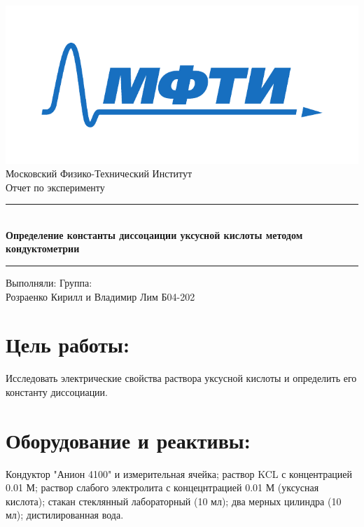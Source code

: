 \documentclass[a4paper,12pt]{article}
\begin{document}
\begin{titlepage}
		\vspace*{\fill}
		
		\begin{center}
			\includegraphics[scale=0.8]{MIPT.pdf}
			\\[0.7cm]\Huge Московский Физико-Технический Институт
			\\[2cm]\LARGE Отчет по эксперименту
			\\[0.5cm]\noindent\rule{\textwidth}{1pt}
			\\\Huge\textbf{Определение константы диссоцаиции уксусной кислоты методом кондуктометрии}
			\\[-0.5cm]\noindent\rule{\textwidth}{1pt}
		\end{center}
		
		\vspace*{\fill}
		
		\begin{flushleft}
			Выполняли: \hspace{\fill} Группа:
			\\Розраенко Кирилл и Владимир Лим \hspace{\fill} Б04-202
		\end{flushleft}
	\end{titlepage}

	\setcounter{page}{2}
\section*{Цель работы:}
Исследовать электрические свойства раствора уксусной кислоты и определить его константу диссоциации.
\section*{Оборудование и реактивы:}
Кондуктор "Анион 4100" и измерительная ячейка; раствор KCL с концентрацией 0.01 М; раствор слабого электролита с концецнтрацией 0.01 М (уксусная кислота); стакан стеклянный лабораторный (10 мл); два мерных цилиндра (10 мл); дистилированная вода.
\end{document}
